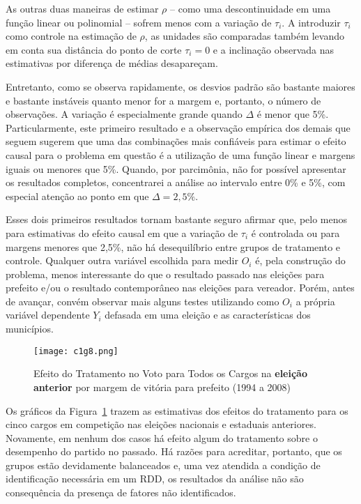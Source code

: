 As outras duas maneiras de estimar $\rho$ -- como uma descontinuidade em uma função linear ou polinomial -- sofrem menos com a variação de $\tau_{i}$. A introduzir $\tau_{i}$ como controle na estimação de $\rho$, as unidades são comparadas também levando em conta sua distância do ponto de corte $\tau_{i}=0$ e a inclinação observada nas estimativas por diferença de médias desapareçam.

Entretanto, como se observa rapidamente, os desvios padrão são bastante maiores e bastante instáveis quanto menor for a margem e, portanto, o número de observações. A variação é especialmente grande quando $\Delta$ é menor que 5\%. Particularmente, este primeiro resultado e a observação empírica dos demais que seguem sugerem que uma das combinações mais confiáveis para estimar o efeito causal para o problema em questão é a utilização de uma função linear e margens iguais ou menores que 5\%. Quando, por parcimônia, não for possível apresentar os resultados completos, concentrarei a análise ao intervalo entre 0\% e 5\%, com especial atenção ao ponto em que $\Delta=2,5\%$.

Esses dois primeiros resultados tornam bastante seguro afirmar que, pelo menos para estimativas do efeito causal em que a variação de $\tau_{i}$ é controlada ou para margens menores que 2,5\%, não há desequilíbrio entre grupos de tratamento e controle. Qualquer outra variável escolhida para medir $O_{i}$ é, pela construção do problema, menos interessante do que o resultado passado nas eleições para prefeito e/ou o resultado contemporâneo nas eleições para vereador. Porém, antes de avançar, convém observar mais alguns testes utilizando como $O_{i}$ a própria variável dependente $Y_{i}$ defasada em uma eleição e as características dos municípios.

\begin{figure}[htp]
	\centering
	\texttt{[image: c1g8.png]}
	\caption{Efeito do Tratamento no Voto para Todos os Cargos na \textbf{eleição anterior} por margem de vitória para prefeito (1994 a 2008)}
	\label{fig:c1g8} 
\end{figure}

Os gráficos da Figura~\ref{fig:c1g8} trazem as estimativas dos efeitos do tratamento para os cinco cargos em competição nas eleições nacionais e estaduais anteriores. Novamente, em nenhum dos casos há efeito algum do tratamento sobre o desempenho do partido no passado. Há razões para acreditar, portanto, que os grupos estão devidamente balanceados e, uma vez atendida a condição de identificação necessária em um RDD, os resultados da análise não são consequência da presença de fatores não identificados.

